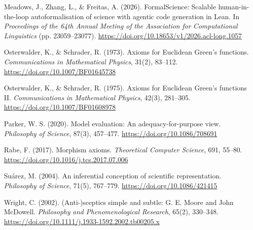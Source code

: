 \documentclass[pdflatex,sn-apa]{sn-jnl}
\begin{document}
\noindent Meadows, J., Zhang, L., \& Freitas, A. (2026). FormalScience: Scalable human-in-the-loop autoformalisation of science with agentic code generation in Lean. In \emph{Proceedings of the 64th Annual Meeting of the Association for Computational Linguistics} (pp. 23059--23077). \url{https://doi.org/10.18653/v1/2026.acl-long.1057}\par\medskip

\noindent Osterwalder, K., \& Schrader, R. (1973). Axioms for Euclidean Green's functions. \emph{Communications in Mathematical Physics}, 31(2), 83--112. \url{https://doi.org/10.1007/BF01645738}\par\medskip

\noindent Osterwalder, K., \& Schrader, R. (1975). Axioms for Euclidean Green's functions II. \emph{Communications in Mathematical Physics}, 42(3), 281--305. \url{https://doi.org/10.1007/BF01608978}\par\medskip

\noindent Parker, W. S. (2020). Model evaluation: An adequacy-for-purpose view. \emph{Philosophy of Science}, 87(3), 457--477. \url{https://doi.org/10.1086/708691}\par\medskip

\noindent Rabe, F. (2017). Morphism axioms. \emph{Theoretical Computer Science}, 691, 55--80. \url{https://doi.org/10.1016/j.tcs.2017.07.006}\par\medskip

\noindent Suárez, M. (2004). An inferential conception of scientific representation. \emph{Philosophy of Science}, 71(5), 767--779. \url{https://doi.org/10.1086/421415}\par\medskip

\noindent Wright, C. (2002). (Anti-)sceptics simple and subtle: G. E. Moore and John McDowell. \emph{Philosophy and Phenomenological Research}, 65(2), 330--348. \url{https://doi.org/10.1111/j.1933-1592.2002.tb00205.x}\par\medskip
\end{document}
